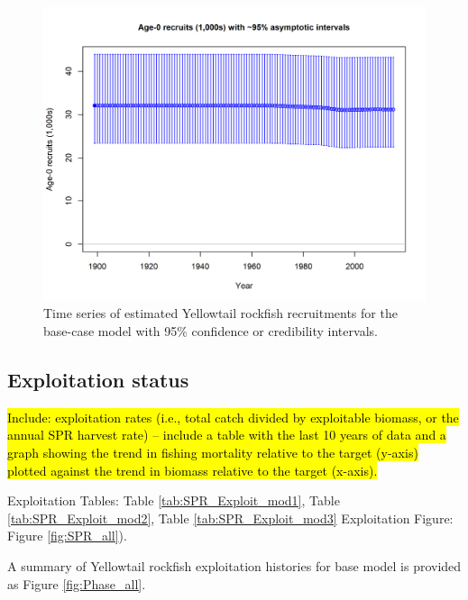 \documentclass[12pt,]{article}
\begin{document}
\begin{figure}[htbp]
\centering
\includegraphics{r4ss/plots_mod1/ts11_Age-0_recruits_(1000s)_with_95_asymptotic_intervals.png}
\caption{Time series of estimated Yellowtail rockfish recruitments for
the base-case model with 95\% confidence or credibility intervals.
\label{fig:Recruits_all}}
\end{figure}

\FloatBarrier

\subsection*{Exploitation status}\label{exploitation-status}

\hl{Include: exploitation rates (i.e., total catch divided by exploitable biomass, or the annual SPR harvest rate) – include a table with the last 10 years of data and a graph showing the trend in fishing mortality relative to the target (y-axis) plotted against the trend in biomass relative to the target (x-axis).}

Exploitation Tables: Table \ref{tab:SPR_Exploit_mod1}, Table
\ref{tab:SPR_Exploit_mod2}, Table \ref{tab:SPR_Exploit_mod3}
Exploitation Figure: Figure \ref{fig:SPR_all}).

A summary of Yellowtail rockfish exploitation histories for base model
is provided as Figure \ref{fig:Phase_all}.

\FloatBarrier
\end{document}
